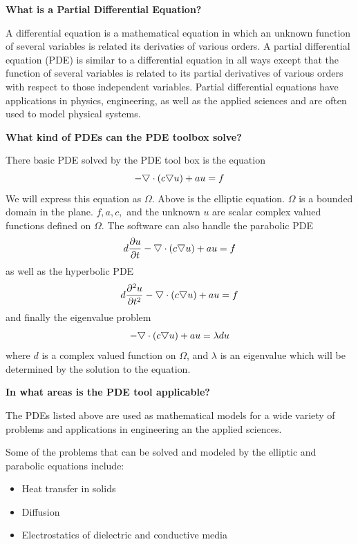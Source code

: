 \documentclass{amsart}
\theoremstyle{definition}
\begin{document}
\Large
\noindent
\textbf{What is a Partial Differential Equation?} \par
\normalsize
A differential equation is a mathematical equation in which an unknown function of several variables is related its derivaties of various orders. A partial differential equation (PDE) is similar to a differential equation in all ways except that the function of several variables is related to its partial derivatives of various orders with respect to those independent variables. Partial differential equations have applications in physics, engineering, as well as the applied sciences and are often used to model physical systems.
\par
\bigskip
\noindent
\Large
\textbf{What kind of PDEs can the PDE toolbox solve?} \par
\normalsize
There basic PDE solved by the PDE tool box is the equation
\begin{equation}
-\raisebox{.4ex}{$\bigtriangledown$} \cdot (c \raisebox{.4ex}{$\bigtriangledown$} u) + a u = f   \label{E:ellip} 
\end{equation}
We will express this equation as $\Omega$. Above is the elliptic equation. $\Omega$ is a bounded domain in the plane. $f, a, c,$ and the unknown $u$ are scalar complex valued functions defined on $\Omega$. The software can also handle the parabolic PDE
\begin{equation}
d \frac{\partial u}{\partial t} -\raisebox{.4ex}{$\bigtriangledown$} \cdot (c \raisebox{.4ex}{$\bigtriangledown$} u) + a u = f   \label{E:par}
\end{equation}
as well as the hyperbolic PDE
\begin{equation}
d \frac{\partial ^2 u}{\partial t^2} -\raisebox{.4ex}{$\bigtriangledown$} \cdot (c \raisebox{.4ex}{$\bigtriangledown$} u) + a u = f
\end{equation}
and finally the eigenvalue problem
\begin{equation}
-\raisebox{.4ex}{$\bigtriangledown$} \cdot (c \raisebox{.4ex}{$\bigtriangledown$} u) + a u = \lambda d u
\end{equation}
where $d$ is a complex valued function on $\Omega$, and $\lambda$ is an eigenvalue which will be determined by the solution to the equation. 

\par
\bigskip
\noindent
\Large
\textbf{In what areas is the PDE tool applicable?} \par
\normalsize
The PDEs listed above are used as mathematical models for a wide variety of problems and applications in engineering an the applied sciences. \par 
Some of the problems that can be solved and modeled by the elliptic and parabolic equations include:
\begin{itemize}
\item Heat transfer in solids
\item Diffusion
\item Electrostatics of dielectric and conductive media
\end{itemize}
\end{document}
